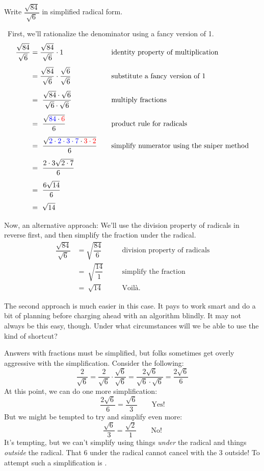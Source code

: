 \begin{boxedex}
Write $\dfrac{\sqrt{84}}{\sqrt{6}}$ in simplified radical form.

\exsoln\ First, we'll rationalize the denominator using a fancy version of 1.
\[\begin{aligned}
\dfrac{\sqrt{84}}{\sqrt{6}} &= \dfrac{\sqrt{84}}{\sqrt{6}} \cdot 1
&&\quad\text{identity property of multiplication}
\\[1ex]
&= \dfrac{\sqrt{84}}{\sqrt{6}} \cdot \dfrac{\sqrt{6}}{\sqrt{6}}
&&\quad\text{substitute a fancy version of 1}
\\[1ex]
&=~ \dfrac{\sqrt{84} \cdot \sqrt{6}}{\sqrt{6} \cdot \sqrt{6}}
&&\quad\text{multiply fractions}
\\[1ex]
&=~ \dfrac{\sqrt{{\color{blue}84} \cdot {\color{red}6}}}{6}
&&\quad\text{product rule for radicals}
\\[1ex]
&=~ \dfrac{\sqrt{{\color{blue}2 \cdot 2 \cdot 3 \cdot 7} \cdot {\color{red}3 \cdot 2}}}{6}
&&\quad\text{simplify numerator using the sniper method}
\\[1ex]
&=~ \dfrac{2 \cdot 3 \sqrt{2 \cdot 7}}{6}
&&\quad\text{}
\\[1ex]
&=~ \dfrac{6 \sqrt{14}}{6}
&&\quad\text{}
\\[1ex]
&=~ \sqrt{14}
&&\quad\text{}\\
\end{aligned}
\]

Now, an alternative approach: We'll use the division property of radicals in reverse first, and then simplify the fraction under the radical.
\[\begin{aligned}
\dfrac{\sqrt{84}}{\sqrt{6}} &= \sqrt{\dfrac{84}{6}}
&&\quad\text{division property of radicals}
\\[1ex]
&=~ \sqrt{\dfrac{14}{1}}
&&\quad\text{simplify the fraction}
\\[1ex]
&=~ \sqrt{14}
&&\quad\text{Voil\`a.}
\end{aligned}
\]
\end{boxedex}

The second approach is much easier in this case. It pays to work smart and do a bit of planning before charging ahead with an algorithm blindly. It may not always be this easy, though. Under what circumstances will we be able to use the kind of shortcut?

\begin{boxedwarning}
Answers with fractions must be simplified, but folks sometimes get overly aggressive with the simplification. Consider the following: \[\frac{2}{\sqrt{6}} = \frac{2}{\sqrt{6}}\cdot\frac{\sqrt{6}}{\sqrt{6}} = \frac{2\sqrt{6}}{\sqrt{6}\cdot\sqrt{6}} = \frac{2\sqrt{6}}{6}\]
At this point, we can do one more simplification: \[\frac{2\sqrt{6}}{6} = \frac{\sqrt{6}}{3} \qquad \text{Yes!}\]
But we might be tempted to try and simplify even more: \[\frac{\sqrt{6}}{3} = \frac{\sqrt{2}}{1} \qquad \text{No!}\]
It's tempting, but we can't simplify using things \textit{under} the radical and things \textit{outside} the radical. That 6 under the radical cannot cancel with the 3 outside! To attempt such a simplification is \evilandwrong.
\end{boxedwarning}

